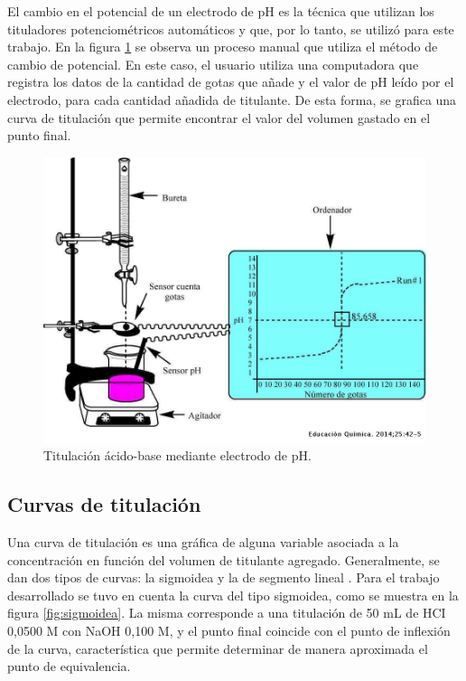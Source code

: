 El cambio en el potencial de un electrodo de pH es la técnica que utilizan los tituladores potenciométricos automáticos y que, por lo tanto, se utilizó para este trabajo. En la figura \ref{fig:titManualPot} se observa un proceso manual que utiliza el método de cambio de potencial. En este caso, el usuario utiliza una computadora que registra los datos de la cantidad de gotas que añade y el valor de pH leído por el electrodo, para cada cantidad añadida de titulante. De esta forma, se grafica una curva de titulación que permite encontrar el valor del volumen gastado en el punto final.


\begin{figure}[htbp]
	\centering
	\includegraphics[width=.7\textwidth]{./Figures/titulacionPotManual.jpeg}
	\caption{Titulación ácido-base mediante electrodo de pH\protect\footnotemark.}
	\label{fig:titManualPot}
\end{figure}


\subsection{Curvas de titulación}

Una curva de titulación es una gráfica de alguna variable asociada a la concentración en función del volumen de titulante agregado. Generalmente, se dan dos tipos de curvas: la sigmoidea y la de segmento lineal \citep{BOOK:1}.
Para el trabajo desarrollado se tuvo en cuenta la curva del tipo sigmoidea, como se muestra en la figura \ref{fig:sigmoidea}. La misma corresponde a una titulación de 50 mL de HCI 0,0500 M con NaOH 0,100 M, y el punto final coincide con el punto de inflexión de la curva, característica que permite determinar de manera aproximada el punto de equivalencia. 

